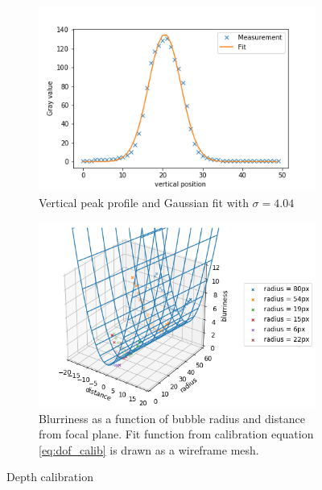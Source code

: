 			\begin{figure}
				\centering
				\begin{subfigure}[b]{\textwidth}
						\centering
						\includegraphics[scale=.6]{graphs/peak_profile_fit.png}
						\caption{Vertical peak profile and Gaussian fit with $\sigma = 4.04$}
						\label{subfig:peak_profile}
					\end{subfigure}%
					
				\begin{subfigure}[b]{\textwidth}
					\centering
						\includegraphics[scale=.6]{images/dof_calibration_fit.png}
						\caption{Blurriness as a function of bubble radius and distance from focal plane. Fit function from calibration equation \ref{eq:dof_calib} is drawn as a wireframe mesh.}
						\label{subfig:depth_calib_fit_result}
					\end{subfigure}								
				
				\caption{Depth calibration}
				\label{fig:depth_calib}
			\end{figure}
			
